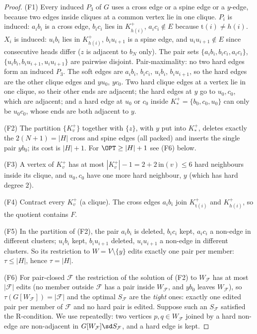 \begin{proof}
(F1) Every induced $P_3$ of $G$ uses a cross edge or a spine edge or a $y$-edge, because two edges inside cliques at a common vertex lie in one clique. $P_i$ is induced: $a_ib_i$ is a cross edge, $b_ic_i$ lies in $K^+_{h(i)}$, $a_ic_i\notin E$ because $\mathrm t(i)\ne h(i)$. $X_i$ is induced: $u_ib_i$ lies in $K^+_{h(i)}$, $b_iu_{i+1}$ is a spine edge, and $u_iu_{i+1}\notin E$ since consecutive heads differ ($z$ is adjacent to $b_N$ only). The pair sets $\{a_ib_i,b_ic_i,a_ic_i\}$, $\{u_ib_i,b_iu_{i+1},u_iu_{i+1}\}$ are pairwise disjoint. Pair-maximality: no two hard edges form an induced $P_3$. The soft edges are $a_ib_i$, $b_ic_i$, $u_ib_i$, $b_iu_{i+1}$, so the hard edges are the other clique edges and $yu_0$, $yc_0$. Two hard clique edges at a vertex lie in one clique, so their other ends are adjacent; the hard edges at $y$ go to $u_0,c_0$, which are adjacent; and a hard edge at $u_0$ or $c_0$ inside $K_*^+=\{b_0,c_0,u_0\}$ can only be $u_0c_0$, whose ends are both adjacent to $y$.

(F2) The partition $\{K_v^+\}$ together with $\{z\}$, with $y$ put into $K_*^+$, deletes exactly the $2(N+1)=|H|$ cross and spine edges (all packed) and inserts the single pair $yb_0$; its cost is $|H|+1$. For $\OPT\ge|H|+1$ see (F6) below.

(F3) A vertex of $K_v^+$ has at most $|K_v^+|-1=2+2\,\mathrm{in}(v)\le6$ hard neighbours inside its clique, and $u_0,c_0$ have one more hard neighbour, $y$ (which has hard degree $2$).

(F4) Contract every $K_v^+$ (a clique). The cross edges $a_ib_i$ join $K^+_{\mathrm t(i)}$ and $K^+_{h(i)}$, so the quotient contains $F$.

(F5) In the partition of (F2), the pair $a_ib_i$ is deleted, $b_ic_i$ kept, $a_ic_i$ a non-edge in different clusters; $u_ib_i$ kept, $b_iu_{i+1}$ deleted, $u_iu_{i+1}$ a non-edge in different clusters. So its restriction to $W=V\setminus\{y\}$ edits exactly one pair per member: $\tau\le|H|$, hence $\tau=|H|$.

(F6) For pair-closed $\mathcal F$ the restriction of the solution of (F2) to $W_{\mathcal F}$ has at most $|\mathcal F|$ edits (no member outside $\mathcal F$ has a pair inside $W_{\mathcal F}$, and $yb_0$ leaves $W_{\mathcal F}$), so $\tau(G[W_{\mathcal F}])=|\mathcal F|$ and the optimal $S_{\mathcal F}$ are the \emph{tight} ones: exactly one edited pair per member of $\mathcal F$ and no hard pair is edited. Suppose such an $S_{\mathcal F}$ satisfied the R-condition. We use repeatedly: two vertices $p,q\in W_{\mathcal F}$ joined by a hard non-edge are non-adjacent in $G[W_{\mathcal F}]\sd S_{\mathcal F}$, and a hard edge is kept.


\end{proof}
